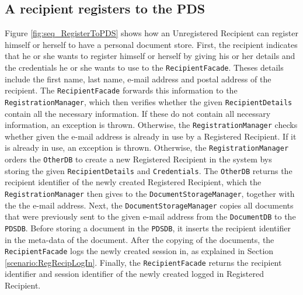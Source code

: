 \documentclass[a4paper,10pt]{article}
\begin{document}
\subsection{A recipient registers to the PDS}
\label{scenario:RegRecipRegisters}
Figure \ref{fig:seq_RegisterToPDS} shows how an Unregistered Recipient can register himself or herself to have a personal document store. First, the recipient indicates that he or she wants to register himself or herself by giving his or her details and the credentials he or she wants to use to the \texttt{RecipientFacade}. Theses details include the first name, last name, e-mail address and postal address of the recipient. The \texttt{RecipientFacade} forwards this information to the \texttt{RegistrationManager}, which then verifies whether the given \texttt{RecipientDetails} contain all the necessary information. If these do not contain all necessary information, an exception is thrown. Otherwise, the \texttt{RegistrationManager} checks whether given the e-mail address is already in use by a Registered Recipient. If it is already in use, an exception is thrown. Otherwise, the \texttt{RegistrationManager} orders the \texttt{OtherDB} to create a new Registered Recipient in the system bys storing the given \texttt{RecipientDetails} and \texttt{Credentials}. The \texttt{OtherDB} returns the recipient identifier of the newly created Registered Recipient, which the \texttt{RegistrationManager} then gives  to the \texttt{DocumentStorageManager}, together with the the e-mail address. Next, the \texttt{DocumentStorageManager} copies all documents that were previously sent to the given e-mail address from the \texttt{DocumentDB} to the \texttt{PDSDB}. Before storing a document in the \texttt{PDSDB}, it inserts the recipient identifier in the meta-data of the document. After the copying of the documents, the \texttt{RecipientFacade} logs the newly created session in, as explained in Section \ref{scenario:RegRecipLogIn}. Finally, the \texttt{RecipientFacade} returns the recipient identifier and session identifier of the newly created logged in Registered Recipient.
\end{document}
